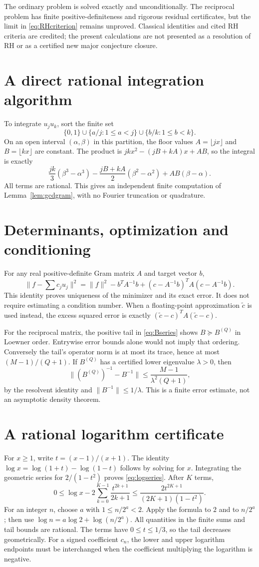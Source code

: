 \documentclass[11pt]{amsart}
\theoremstyle{definition}
\begin{document}
The ordinary problem is solved exactly and unconditionally. The
reciprocal problem has finite positive-definiteness and rigorous
residual certificates, but the limit in \eqref{eq:RHcriterion} remains
unproved. Classical identities and cited RH criteria are credited;
the present calculations are not presented as a resolution of RH or
as a certified new major conjecture closure.

\appendix
\section{A direct rational integration algorithm}
To integrate $u_j u_k$, sort the finite set
\[
 \{0,1\}\cup\{a/j:1\le a<j\}\cup\{b/k:1\le b<k\}.
\]
On an open interval $(\alpha,\beta)$ in this partition, the floor
values $A=\lfloor jx\rfloor$ and $B=\lfloor kx\rfloor$ are constant.
The product is $jkx^2-(jB+kA)x+AB$, so the integral is exactly
\[
 \frac{jk}{3}(\beta^3-\alpha^3)
 -\frac{jB+kA}{2}(\beta^2-\alpha^2)+AB(\beta-\alpha).
\]
All terms are rational. This gives an independent finite computation
of Lemma~\ref{lem:gcdgram}, with no Fourier truncation or quadrature.

\section{Determinants, optimization and conditioning}
For any real positive-definite Gram matrix $A$ and target vector $b$,
\[
 \|f-\textstyle\sum c_ju_j\|^2
 =\|f\|^2-b^TA^{-1}b+(c-A^{-1}b)^TA(c-A^{-1}b).
\]
This identity proves uniqueness of the minimizer and its exact error.
It does not require estimating a condition number.
When a floating-point approximation $\widetilde c$ is used instead,
the excess squared error is exactly
$(\widetilde c-c)^TA(\widetilde c-c)$.

For the reciprocal matrix, the positive tail in \eqref{eq:Bseries}
shows $B\succeq B^{(Q)}$ in Loewner order. Entrywise error bounds
alone would not imply that ordering. Conversely the tail's operator
norm is at most its trace, hence at most $(M-1)/(Q+1)$.
If $B^{(Q)}$ has a certified lower eigenvalue $\lambda>0$, then
\[
 \|(B^{(Q)})^{-1}-B^{-1}\|
 \le\frac{M-1}{\lambda^2(Q+1)},
\]
by the resolvent identity and $\|B^{-1}\|\le1/\lambda$.
This is a finite error estimate, not an asymptotic density theorem.

\section{A rational logarithm certificate}
For $x\ge1$, write $t=(x-1)/(x+1)$. The identity
$\log x=\log(1+t)-\log(1-t)$ follows by solving for $x$.
Integrating the geometric series for $2/(1-t^2)$ proves
\eqref{eq:logseries}. After $K$ terms,
\[
 0\le\log x-2\sum_{k=0}^{K-1}\frac{t^{2k+1}}{2k+1}
 \le\frac{2t^{2K+1}}{(2K+1)(1-t^2)}.
\]
For an integer $n$, choose $a$ with $1\le n/2^a<2$. Apply the
formula to $2$ and to $n/2^a$; then use
$\log n=a\log2+\log(n/2^a)$. All quantities in the finite sums and
tail bounds are rational. The terms have $0\le t\le1/3$, so the
tail decreases geometrically. For a signed coefficient $c_n$, the
lower and upper logarithm endpoints must be interchanged when the
coefficient multiplying the logarithm is negative.
\end{document}
